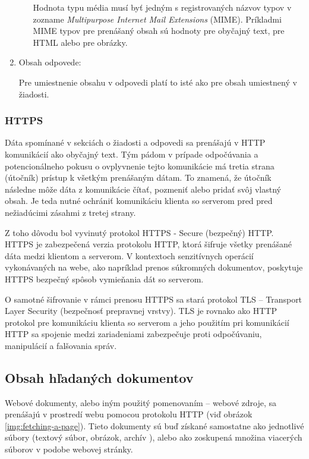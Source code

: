 \begin{enumerate}
\begin{itemize}
        Hodnota typu média musí byť jedným s registrovaných názvov typov v zozname \textit{Multipurpose Internet Mail Extensions} (MIME). 
        Príkladmi MIME typov pre prenášaný obsah sú hodnoty  pre obyčajný text,  pre HTML alebo  pre obrázky.
    \end{itemize}

    \item Obsah odpovede:

    Pre umiestnenie obsahu v odpovedi platí to isté ako pre obsah umiestnený v žiadosti.
\end{enumerate}


\subsubsection{HTTPS}

Dáta spomínané v sekciách o žiadosti a odpovedi sa prenášajú v HTTP komunikácií ako obyčajný text. 
Tým pádom v prípade odpočúvania a potencionálneho pokusu o ovplyvnenie tejto komunikácie má tretia strana (útočník) prístup k všetkým prenášaným dátam. 
To znamená, že útočník následne môže dáta z komunikácie čítať, pozmeniť alebo pridať svôj vlastný obsah. 
Je teda nutné ochrániť komunikáciu klienta so serverom pred pred nežiadúcimi zásahmi z tretej strany.

Z toho dôvodu bol vyvinutý protokol HTTPS - Secure (bezpečný) HTTP.
HTTPS je zabezpečená verzia protokolu HTTP, ktorá šifruje všetky prenášané dáta medzi klientom a serverom.
V kontextoch senzitívnych operácií vykonávaných na webe, ako napríklad prenos súkromných dokumentov, poskytuje HTTPS bezpečný spôsob vymieňania dát so serverom.

O samotné šifrovanie v rámci prenosu HTTPS sa stará protokol TLS -- Transport Layer Security (bezpečnosť prepravnej vrstvy).
TLS je rovnako ako HTTP protokol pre komunikáciu klienta so serverom a jeho použitím pri komunikácií HTTP sa spojenie medzi zariadeniami zabezpečuje proti odpočúvaniu, manipulácií a falšovania správ. 


\subsection{Obsah hľadaných dokumentov}
\label{obsah-hladanych-dokumentov}

Webové dokumenty, alebo iným použitý pomenovaním -- webové zdroje, sa prenášajú v prostredí webu pomocou protokolu HTTP (viď obrázok \ref{img:fetching-a-page}).
Tieto dokumenty sú buď získané samostatne ako jednotlivé súbory (textový súbor, obrázok, archív ), alebo ako zoskupená množina viacerých súborov v podobe webovej stránky.

